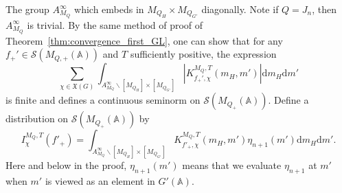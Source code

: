\documentclass[letterpaper,11pt]{amsart}
\newcommand{\fX}{\mathfrak{X}}
\newcommand{\bA}{\mathbb{A}}
\newcommand{\cS}{\mathcal{S}}
\newcommand{\rd}{\mathrm{d}}
\newcommand{\<}{\negthickspace}
\providecommand{\Abs}[1]{\left\lvert#1\right\rvert}
\theoremstyle{definition}
\theoremstyle{plain}
\theoremstyle{remark}
\numberwithin{equation}{section}
\begin{document}
The group $A_{M_Q}^\infty$ which embeds in $M_{Q_H} \times M_{Q_{G'}}$ diagonally.
Note if $Q = J_n$, then $A_{M_Q}^\infty$ is trivial. By the same
method of proof of Theorem~\ref{thm:convergence_first_GL}, one can show that
for any $f_+' \in \cS(M_{Q,+}(\bA))$ and $T$ sufficiently positive, the
expression
    \begin{equation} \label{eq:convergent_Levi}
    \sum_{\chi \in \fX(G)}
    \int_{A_{M_Q}^\infty \backslash [M_{Q_H}] \times [M_{Q_{G'}}]}
    \Abs{K_{f_+',\chi}^{M_Q,T}(m_H,m')} \rd m_H \rd m'
    \end{equation}
is finite and defines a continuous seminorm on $\cS(M_{Q_+}(\bA))$. Define
a distribution on $\cS(M_{Q_+}(\bA))$ by
    \[
    I^{M_Q,T}_\chi(f'_+) =
    \int_{A_{M_Q}^\infty \backslash [M_{Q_H}] \times [M_{Q_{G'}}]}
    K_{f'_+,\chi}^{M_Q,T}(m_H,m') \eta_{n+1}(m') \rd m_H \rd m'.
    \]
Here and below in the proof, $\eta_{n+1}(m')$ means that we evaluate $\eta_{n+1}$
at $m'$ when $m'$ is viewed as an element in $G'(\bA)$.
\end{document}
